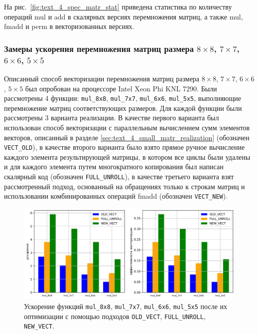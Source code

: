 На рис.~\ref{fig:text_4_spec_matr_stat} приведена статистика по количеству операций mul и add в скалярных версиях перемножения матриц, а также mul, fmadd и perm в векторизованных версиях.

\subsubsection{Замеры ускорения перемножения матриц размера $8 \times 8$, $7 \times 7$, $6 \times 6$, $5 \times 5$}

Описанный способ векторизации перемножения матриц размера $8 \times 8$, $7 \times 7$, $6 \times 6$, $5 \times 5$ был опробован на процессоре Intel Xeon Phi KNL 7290.
Были рассмотрены 4 функции: \texttt{mul\_8x8}, \texttt{mul\_7x7}, \texttt{mul\_6x6}, \texttt{mul\_5x5}, выполняющие перемножение матриц соответствующих размеров.
Для каждой функции были рассмотрены 3 варианта реализации.
В качестве первого варианта был использован способ векторизации с параллельным вычислением сумм элементов векторов, описанный в разделе \ref{sec:text_4_small_matr_realization} (обозначен \texttt{VECT\_OLD}), в качестве второго варианта было взято прямое ручное вычисление каждого элемента результирующей матрицы, в котором все циклы были удалены и для каждого элемента путем многократного копирования был написан скалярный код (обозначен \texttt{FULL\_UNROLL}), в качестве третьего варианта взят рассмотренный подход, основанный на обращениях только к строкам матриц и использовании комбинированных операций fmadd (обозначен \texttt{VECT\_NEW}).

\begin{figure}[ht]
\centering
\includegraphics[width=1.0\textwidth]{./pics/text_4_spec_matr/res.png}
\singlespacing
{}\caption{Ускорение функций \texttt{mul\_8x8}, \texttt{mul\_7x7}, \texttt{mul\_6x6}, \texttt{mul\_5x5} после их оптимизации с помощью подходов \texttt{OLD\_VECT}, \texttt{FULL\_UNROLL}, \texttt{NEW\_VECT}.}
\label{fig:text_4_spec_matr_res}
\end{figure}

